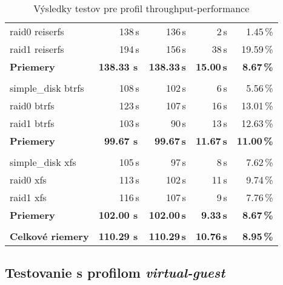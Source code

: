 {{{{\begin{table}[H]
\begin{center}
\begin{tabular}{|l|r r r r|}
    raid0 reiserfs & 138\,s & 136\,s & 2\,s & 1.45\,\% \\
    raid1 reiserfs & 194\,s & 156\,s & 38\,s & 19.59\,\% \\
    \hline
    \textbf{Priemery} & \textbf{138.33 s}\,& \textbf{138.33\,s} & \textbf{15.00\,s} & \textbf{8.67\,\%} \\
    \hline & \\[-1em]\hline
    simple\_disk btrfs & 108\,s & 102\,s & 6\,s & 5.56\,\% \\
    raid0 btrfs & 123\,s & 107\,s & 16\,s & 13.01\,\% \\
    raid1 btrfs & 103\,s & 90\,s & 13\,s & 12.63\,\% \\
    \hline
    \textbf{Priemery} & \textbf{99.67 s}\,& \textbf{99.67\,s} & \textbf{11.67\,s} & \textbf{11.00\,\%} \\
    \hline & \\[-1em]\hline
    simple\_disk xfs & 105\,s & 97\,s & 8\,s & 7.62\,\% \\
    raid0 xfs & 113\,s & 102\,s & 11\,s & 9.74\,\% \\
    raid1 xfs & 116\,s & 107\,s & 9\,s & 7.76\,\% \\
    \hline
    \textbf{Priemery} & \textbf{102.00 s}\,& \textbf{102.00\,s} & \textbf{9.33\,s} & \textbf{8.67\,\%} \\
    \hline & \\[-1em]\hline
    \textbf{Celkové riemery} & \textbf{110.29 s}\,& \textbf{110.29\,s} & \textbf{10.76\,s} & \textbf{8.95\,\%} \\
    \hline
\end{tabular}
\caption{Výsledky testov pre profil throughput-performance}
\label{tab:results-xfs}
\end{center}
\end{table}

\subsection{Testovanie s profilom \emph{virtual-guest}}

}}}}
